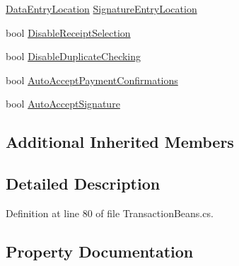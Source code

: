 \begin{DoxyCompactItemize}
\item 
\hyperlink{namespacecom_1_1clover_1_1sdk_1_1v3_1_1payments_ad57b15539defff23c13ea55aedf1c551}{Data\+Entry\+Location} \hyperlink{classcom_1_1clover_1_1remotepay_1_1sdk_1_1_transaction_request_a078d156b75dc2d7827e9d676b28f601b}{Signature\+Entry\+Location}
\item 
bool \hyperlink{classcom_1_1clover_1_1remotepay_1_1sdk_1_1_transaction_request_ae500f2d47fb433f0fde15fc67d21fce1}{Disable\+Receipt\+Selection}
\item 
bool \hyperlink{classcom_1_1clover_1_1remotepay_1_1sdk_1_1_transaction_request_a6ccf4996be466b84f478ff787f759590}{Disable\+Duplicate\+Checking}
\item 
bool \hyperlink{classcom_1_1clover_1_1remotepay_1_1sdk_1_1_transaction_request_a0a8f3b9f8ecf64e509592b57895b774b}{Auto\+Accept\+Payment\+Confirmations}
\item 
bool \hyperlink{classcom_1_1clover_1_1remotepay_1_1sdk_1_1_transaction_request_a33c7f4e4e70bc7237300429209f94610}{Auto\+Accept\+Signature}
\end{DoxyCompactItemize}
\subsection*{Additional Inherited Members}


\subsection{Detailed Description}




Definition at line 80 of file Transaction\+Beans.\+cs.



\subsection{Property Documentation}
\mbox{\label{classcom_1_1clover_1_1remotepay_1_1sdk_1_1_transaction_request_ad7cf74d6782da8302064c64b1252fb3d}} 
